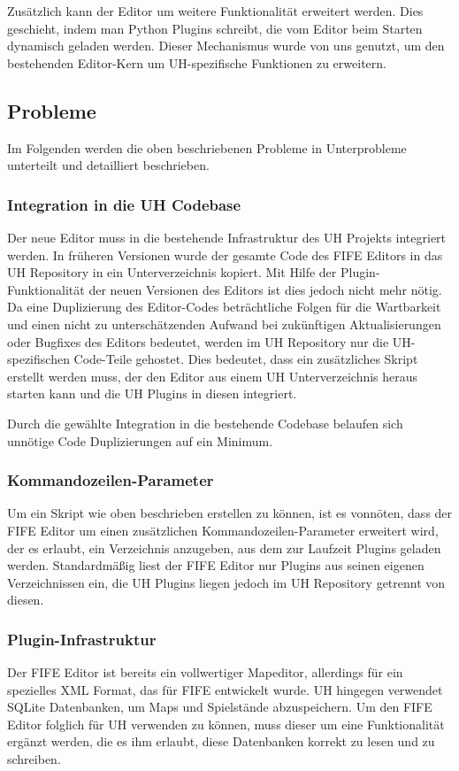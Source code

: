 Zusätzlich kann der Editor um weitere Funktionalität erweitert werden. Dies geschieht,
indem man Python Plugins schreibt, die vom Editor beim Starten dynamisch geladen
werden. Dieser Mechanismus wurde von uns genutzt, um den bestehenden Editor-Kern
um UH-spezifische Funktionen zu erweitern.

\subsection{Probleme}
Im Folgenden werden die oben beschriebenen Probleme in Unterprobleme unterteilt
und detailliert beschrieben.

\subsubsection{Integration in die UH Codebase}
Der neue Editor muss in die bestehende Infrastruktur des UH Projekts integriert werden.
In früheren Versionen wurde der gesamte Code des FIFE Editors in das UH Repository
in ein Unterverzeichnis kopiert. Mit Hilfe der Plugin-Funktionalität der neuen Versionen
des Editors ist dies jedoch nicht mehr nötig. Da eine Duplizierung des Editor-Codes
beträchtliche Folgen für die Wartbarkeit und einen nicht zu unterschätzenden Aufwand
bei zukünftigen Aktualisierungen oder Bugfixes des Editors bedeutet, werden im UH
Repository nur die UH-spezifischen Code-Teile gehostet. Dies bedeutet, dass ein
zusätzliches Skript erstellt werden muss, der den Editor aus einem UH Unterverzeichnis
heraus starten kann und die UH Plugins in diesen integriert.

Durch die gewählte Integration in die bestehende Codebase belaufen sich unnötige
Code Duplizierungen auf ein Minimum.


\subsubsection{Kommandozeilen-Parameter}
Um ein Skript wie oben beschrieben erstellen zu können, ist es vonnöten, dass
der FIFE Editor um einen zusätzlichen Kommandozeilen-Parameter erweitert wird,
der es erlaubt, ein Verzeichnis anzugeben, aus dem zur Laufzeit Plugins geladen
werden.
Standardmäßig liest der FIFE Editor nur Plugins aus seinen eigenen
Verzeichnissen ein, die UH Plugins liegen jedoch im UH Repository getrennt von
diesen.

\subsubsection{Plugin-Infrastruktur}
\label{plugininfrastruktur}
Der FIFE Editor ist bereits ein vollwertiger Mapeditor, allerdings für ein spezielles XML Format,
das für FIFE entwickelt wurde. UH hingegen verwendet SQLite Datenbanken, um Maps und Spielstände
abzuspeichern. Um den FIFE Editor folglich für UH verwenden zu können, muss dieser um eine
Funktionalität ergänzt werden, die es ihm erlaubt, diese Datenbanken korrekt zu lesen und zu schreiben.

